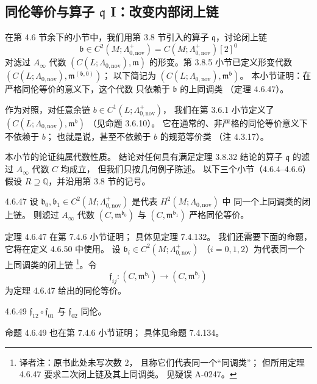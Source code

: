 
\subsection{同伦等价与算子 $\mathfrak q$ I：改变内部闭上链}
\label{subsec:4-6-4}

在第 4.6 节余下的小节中，我们用第 3.8 节引入的算子
$\mathfrak q$，讨论闭上链
\[
\mathfrak b\in C^2(M;\Lambda^+_{0,\mathrm{nov}})
=C(M;\Lambda^+_{0,\mathrm{nov}})[2]^0
\]
对滤过 $A_\infty$ 代数
$(C(L;\Lambda_{0,\mathrm{nov}}),\mathfrak m)$
的形变。第 3.8.5 小节已定义形变代数
$(C(L;\Lambda_{0,\mathrm{nov}}),\mathfrak m^{(\mathfrak b,0)})$；
以下简记为 $(C(L;\Lambda_{0,\mathrm{nov}}),
\mathfrak m^{\mathfrak b})$。
本小节证明：在严格同伦等价的意义下，这个代数
只依赖于 $\mathfrak b$ 的上同调类
（定理 4.6.47）。

作为对照，对任意余链
$b\in C^1(L;\Lambda^+_{0,\mathrm{nov}})$，
我们在第 3.6.1 小节定义了
$(C(L;\Lambda_{0,\mathrm{nov}}),\mathfrak m^b)$
（见命题 3.6.10）。
它在通常的、非严格的同伦等价意义下不依赖于 $b$；
也就是说，甚至不依赖于 $b$ 的规范等价类
（注 4.3.17）。

本小节的论证纯属代数性质。
结论对任何具有满足定理 3.8.32 结论的算子
$\mathfrak q$ 的滤过 $A_\infty$ 代数 $C$ 均成立，
但我们只按几何例子陈述。
以下三个小节（4.6.4--4.6.6）假设
$R\supseteq\mathbb Q$，并沿用第 3.8 节的记号。

\begin{theorem}{4.6.47}\label{thm:4-6-47}
设 $\mathfrak b_0,\mathfrak b_1
\in C^2(M;\Lambda^+_{0,\mathrm{nov}})$
是代表 $H^2(M;\Lambda_{0,\mathrm{nov}})$ 中
同一个上同调类的闭上链。
则滤过 $A_\infty$ 代数
$(C,\mathfrak m^{\mathfrak b_0})$
与 $(C,\mathfrak m^{\mathfrak b_1})$
严格同伦等价。
\end{theorem}

定理 4.6.47 在第 7.4.6 小节证明；
具体见定理 7.4.132。
我们还需要下面的命题，
它将在定义 4.6.50 中使用。
设 $\mathfrak b_i
\in C^2(M;\Lambda^+_{0,\mathrm{nov}})$
（$i=0,1,2$）为代表同一个上同调类的闭上链
\footnote{译者注：原书此处未写次数 $2$，
且称它们代表同一个“同调类”；
但所用定理 4.6.47 要求二次闭上链及其上同调类。
见疑误 A-0247。}。令
\begin{equation}
\mathfrak f_{ij}\colon
(C,\mathfrak m^{\mathfrak b_i})
\longrightarrow
(C,\mathfrak m^{\mathfrak b_j})
\tag{4.6.48}\label{eq:4-6-48}
\end{equation}
为定理 4.6.47 给出的同伦等价。
\begin{proposition}{4.6.49}\label{prop:4-6-49}
$\mathfrak f_{12}\circ\mathfrak f_{01}$
与 $\mathfrak f_{02}$ 同伦。
\end{proposition}
命题 4.6.49 也在第 7.4.6 小节证明；
具体见命题 7.4.134。

